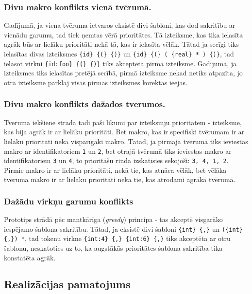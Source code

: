 \subsubsection{Divu makro konflikts vienā tvērumā.}

Gadījumā, ja viena tvēruma ietvaros eksistē divi šabloni, kas dod sakritību ar vienādu garumu, tad tiek ņemtas vērā prioritātes. Tā izteiksme, kas tika ielasīta agrāk būs ar lielāku prioritāti nekā tā, kas ir ielasīta vēlāk. Tātad ja secīgi tiks ielasītas divas izteiksmes \verb|{id} {(} {)}| un \verb|{id} {(} ( {real} * ) {)}|, tad ielasot virkni \verb|{id:foo} {(} {)}| tiks akceptēta pirmā izteiksme. Gadījumā, ja izteiksmes tiks ielasītas pretējā secībā, pirmā izteiksme nekad netiks atpazīta, jo otrā izteiksme pārklāj visas pirmās izteiksmes korektās ieejas.

\subsubsection{Divu makro konflikts dažādos tvērumos.}

Tvēruma iekšienē strādā tādi paši likumi par izteiksmju prioritātēm - izteiksme, kas bija agrāk ir ar lielāku prioritāti. Bet makro, kas ir specifiski tvērumam ir ar lielāku prioritāti nekā vispārīgāki makro. Tātad, ja pirmajā tvērumā tiks ieviestas makro ar identifikatoriem \verb|1| un \verb|2|, bet otrajā tvērumā tiks ieviestas makro ar identifikatoriem \verb|3| un \verb|4|, to prioritāšu rinda izskatīsies sekojoši: \verb|3, 4, 1, 2|. Pirmie makro ir ar lielāku prioritāti, nekā tie, kas atnāca vēlāk, bet vēlāka tvēruma makro ir ar lielāku prioritāti neka tie, kas atrodami agrākā tvērumā.

\subsubsection{Dažādu virkņu garumu konflikts}
Prototips strādā pēc mantkārīga (\emph{greedy}) principa - tas akceptē visgarāko iespējamo šablona sakritību. Tātad, ja eksistē divi šabloni \verb|{int} {,}| un \verb|({int} {,}) *|, tad tokenu virkne \verb|{int:4} {,} {int:6} {,}| tiks akceptēta ar otru šablonu, neskatoties uz to, ka augstākās prioritātes šablona sakritība tika konstatēta agrāk.

\subsection{\label{sbs:prot_motivation}Realizācijas pamatojums}

